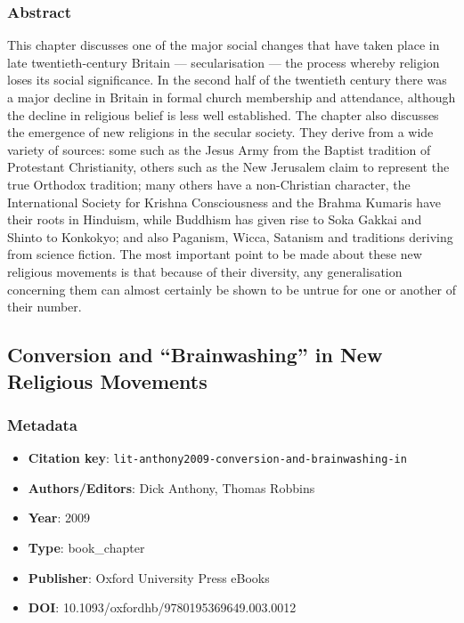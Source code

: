 \subsubsection*{Abstract}
This chapter discusses one of the major social changes that have taken place in late twentieth-century Britain — secularisation — the process whereby religion loses its social significance. In the second half of the twentieth century there was a major decline in Britain in formal church membership and attendance, although the decline in religious belief is less well established. The chapter also discusses the emergence of new religions in the secular society. They derive from a wide variety of sources: some such as the Jesus Army from the Baptist tradition of Protestant Christianity, others such as the New Jerusalem claim to represent the true Orthodox tradition; many others have a non-Christian character, the International Society for Krishna Consciousness and the Brahma Kumaris have their roots in Hinduism, while Buddhism has given rise to Soka Gakkai and Shinto to Konkokyo; and also Paganism, Wicca, Satanism and traditions deriving from science fiction. The most important point to be made about these new religious movements is that because of their diversity, any generalisation concerning them can almost certainly be shown to be untrue for one or another of their number.

\subsection{Conversion and “Brainwashing” in New Religious Movements}\label{lit:lit-anthony2009-conversion-and-brainwashing-in}
\subsubsection*{Metadata}
\begin{itemize}
  \item \textbf{Citation key}: \texttt{lit-anthony2009-conversion-and-brainwashing-in}
  \item \textbf{Authors/Editors}: Dick Anthony, Thomas Robbins
  \item \textbf{Year}: 2009
  \item \textbf{Type}: book\_chapter
  \item \textbf{Publisher}: Oxford University Press eBooks
  \item \textbf{DOI}: 10.1093/oxfordhb/9780195369649.003.0012
\end{itemize}
